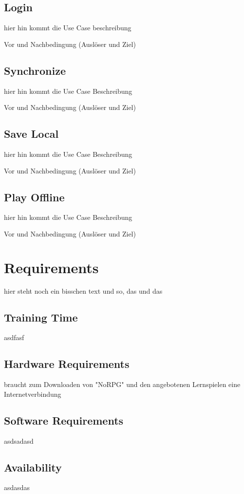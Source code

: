 	
	\subsection*{Login}
		hier hin kommt die Use Case beschreibung
		
		Vor und Nachbedingung (Auslöser und Ziel)
		
	\subsection*{Synchronize}
		hier hin kommt die Use Case Beschreibung
		
		Vor und Nachbedingung (Auslöser und Ziel)		
			
	\subsection*{Save Local}
		hier hin kommt die Use Case Beschreibung
		
		Vor und Nachbedingung (Auslöser und Ziel)	
	
	\subsection*{Play Offline}
		hier hin kommt die Use Case Beschreibung
		
		Vor und Nachbedingung (Auslöser und Ziel)	
	
\section{Requirements}
hier steht noch ein bisschen text und so, das und das
	
	\subsection{Training Time}
		asdfasf
	
	\subsection{Hardware Requirements}
		braucht zum Downloaden von "NoRPG" und den angebotenen Lernspielen eine Internetverbindung	
	
	\subsection{Software Requirements}
		asdsadasd
	
	\subsection{Availability}
		asdasdas
	
